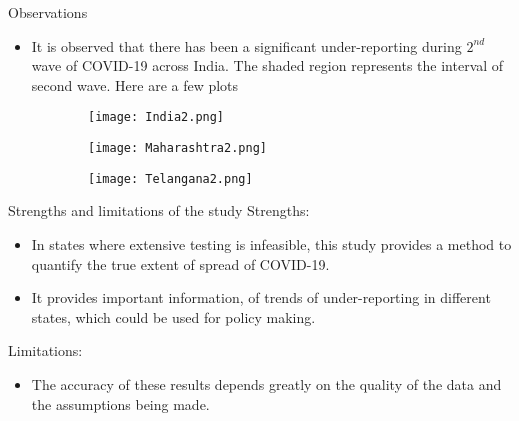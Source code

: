 \documentclass[10pt]{beamer}
\begin{document}
\begin{frame}{Observations}
    \begin{itemize}
        \item It is observed that there has been a significant under-reporting during $2^{nd}$ wave of COVID-19 across India. The shaded region represents the interval of second wave. Here are a few plots
    \end{itemize}
     \begin{figure}
\centering
    \begin{subfigure}[tl]{0.4\textwidth}
        \texttt{[image: India2.png]}
        \label{fig:nature1}
    \end{subfigure}
    \begin{subfigure}[bl]{0.4\textwidth}
        \texttt{[image: Maharashtra2.png]}
        \label{fig:nature2}
    \end{subfigure}
    \begin{subfigure}[br]{0.4\textwidth}
        \texttt{[image: Telangana2.png]}
        \label{fig:nature2}
    \end{subfigure}
\label{fig:images}
\end{figure}
\end{frame}
\begin{frame}{Strengths and limitations of the study}
    Strengths:
    \begin{itemize}
     \item In states where extensive testing is infeasible, this study provides a method to quantify the true extent of spread of COVID-19.
    \item It provides important information, of trends of under-reporting in different states, which could be used for policy making.
    \end{itemize}
    Limitations:
    \begin{itemize}
    \item The accuracy of these results depends greatly on the quality
of the data and the assumptions being made.
    \end{itemize}
\end{frame}
\end{document}
